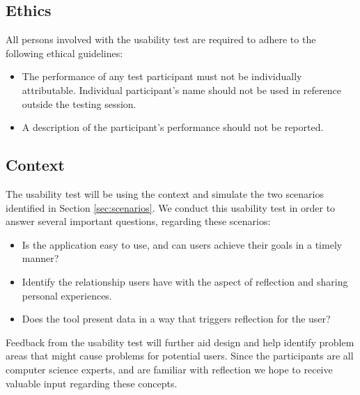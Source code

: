 \subsection{Ethics}
All persons involved with the usability test are required to adhere to the following ethical guidelines:
\begin{itemize}
	\item The performance of any test participant must not be individually attributable. Individual participant's name should not be used in reference outside the testing session.
	\item A description of the participant's performance should not be reported. 
\end{itemize}

\subsection{Context}
The usability test will be using the context and simulate the two scenarios identified in Section \ref{sec:scenarios}. We conduct this usability test in order to answer several important questions, regarding these scenarios: 
\begin{itemize}
	\item Is the application easy to use, and can users achieve their goals in a timely manner?
	\item Identify the relationship users have with the aspect of reflection and sharing personal experiences.
	\item Does the tool present data in a way that triggers reflection for the user?
\end{itemize}
Feedback from the usability test will further aid design and help identify problem areas that might cause problems for potential users. Since the participants are all computer science experts, and are familiar with reflection we hope to receive valuable input regarding these concepts.

